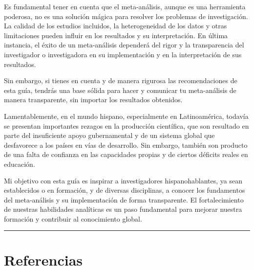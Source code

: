 \documentclass[
  bookmarksnumbered]{article}
\begin{document}
Es fundamental tener en cuenta que el meta-análisis, aunque es una herramienta poderosa, no es una solución mágica para resolver los problemas de investigación. La calidad de los estudios incluidos, la heterogeneidad de los datos y otras limitaciones pueden influir en los resultados y su interpretación. En última instancia, el éxito de un meta-análisis dependerá del rigor y la transparencia del investigador o investigadora en su implementación y en la interpretación de sus resultados.

Sin embargo, si tienes en cuenta y de manera rigurosa las recomendaciones de esta guía, tendrás una base sólida para hacer y comunicar tu meta-análisis de manera transparente, sin importar los resultados obtenidos.

Lamentablemente, en el mundo hispano, especialmente en Latinoamérica, todavía se presentan importantes rezagos en la producción científica, que son resultado en parte del insuficiente apoyo gubernamental y de un sistema global que desfavorece a los países en vías de desarrollo. Sin embargo, también son producto de una falta de confianza en las capacidades propias y de ciertos déficits reales en educación.

Mi objetivo con esta guía es inspirar a investigadores hispanohablantes, ya sean establecidos o en formación, y de diversas disciplinas, a conocer los fundamentos del meta-análisis y su implementación de forma transparente. El fortalecimiento de nuestras habilidades analíticas es un paso fundamental para mejorar nuestra formación y contribuir al conocimiento global.

\begin{center}\rule{0.5\linewidth}{0.5pt}\end{center}

\hypertarget{referencias}{%
\section*{Referencias}\label{referencias}}
\end{document}
